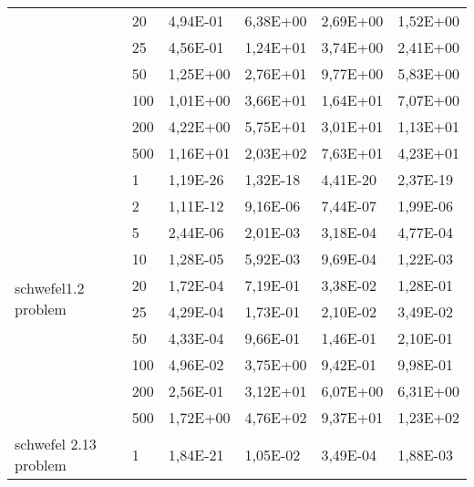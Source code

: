 \begin{longtable}[c]{|m{3.5cm}|l|l|l|l|l|}
                                        & 20        & 4,94E-01   & 6,38E+00   & 2,69E+00   & 1,52E+00  \\ \cline{2-6} 
                                        & 25        & 4,56E-01   & 1,24E+01   & 3,74E+00   & 2,41E+00  \\ \cline{2-6} 
                                        & 50        & 1,25E+00   & 2,76E+01   & 9,77E+00   & 5,83E+00  \\ \cline{2-6} 
                                        & 100       & 1,01E+00   & 3,66E+01   & 1,64E+01   & 7,07E+00  \\ \cline{2-6} 
                                        & 200       & 4,22E+00   & 5,75E+01   & 3,01E+01   & 1,13E+01  \\ \cline{2-6} 
                                        & 500       & 1,16E+01   & 2,03E+02   & 7,63E+01   & 4,23E+01  \\ \hline
\multirow{10}{*}{schwefel1.2 problem}   & 1         & 1,19E-26   & 1,32E-18   & 4,41E-20   & 2,37E-19  \\ \cline{2-6} 
                                        & 2         & 1,11E-12   & 9,16E-06   & 7,44E-07   & 1,99E-06  \\ \cline{2-6} 
                                        & 5         & 2,44E-06   & 2,01E-03   & 3,18E-04   & 4,77E-04  \\ \cline{2-6} 
                                        & 10        & 1,28E-05   & 5,92E-03   & 9,69E-04   & 1,22E-03  \\ \cline{2-6} 
                                        & 20        & 1,72E-04   & 7,19E-01   & 3,38E-02   & 1,28E-01  \\ \cline{2-6} 
                                        & 25        & 4,29E-04   & 1,73E-01   & 2,10E-02   & 3,49E-02  \\ \cline{2-6} 
                                        & 50        & 4,33E-04   & 9,66E-01   & 1,46E-01   & 2,10E-01  \\ \cline{2-6} 
                                        & 100       & 4,96E-02   & 3,75E+00   & 9,42E-01   & 9,98E-01  \\ \cline{2-6} 
                                        & 200       & 2,56E-01   & 3,12E+01   & 6,07E+00   & 6,31E+00  \\ \cline{2-6} 
                                        & 500       & 1,72E+00   & 4,76E+02   & 9,37E+01   & 1,23E+02  \\ \hline
\multirow{10}{*}{schwefel 2.13 problem} & 1         & 1,84E-21   & 1,05E-02   & 3,49E-04   & 1,88E-03  \\ \cline{2-6} 

\end{longtable}
